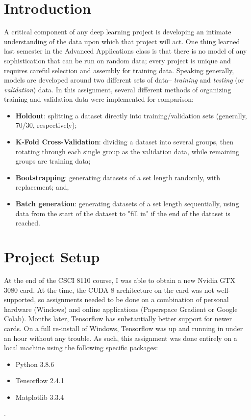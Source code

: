 \documentclass{article}
\begin{document}
  
  \graphicspath{{./images/}}
\section{Introduction}
A critical component of any deep learning project is developing an intimate understanding of the data upon which that project will act.
One thing learned last semester in the Advanced Applications class is that there is no model of any sophistication that can be run on random data; every project is unique and requires careful selection and assembly for training data.
Speaking generally, models are developed around two different sets of data-- \textit{training} and \textit{testing} (or \textit{validation}) data.
In this assignment, several different methods of organizing training and validation data were implemented for comparison:
\begin{itemize}
    \item \textbf{Holdout}: splitting a dataset directly into training/validation sets (generally, 70/30, respectively);
    \item \textbf{K-Fold Cross-Validation}: dividing a dataset into several groups, then rotating through each single group as the validation data, while remaining groups are training data;
    \item \textbf{Bootstrapping}: generating datasets of a set length randomly, with replacement; and,
    \item \textbf{Batch generation}: generating datasets of a set length sequentially, using data from the start of the dataset to "fill in" if the end of the dataset is reached.
\end{itemize}


\section{Project Setup} \label{setup}
At the end of the CSCI 8110 course, I was able to obtain a new Nvidia GTX 3080 card.
At the time, the CUDA 8 architecture on the card was not well-supported, so assignments needed to be done on a combination of personal hardware (Windows) and online applications (Paperspace Gradient or Google Colab).
Months later, Tensorflow has substantially better support for newer cards.
On a full re-install of Windows, Tensorflow was up and running in under an hour without any trouble.
As such, this assignment was done entirely on a local machine using the following specific packages:
\begin{itemize}
    \item Python 3.8.6 
    \item Tensorflow 2.4.1
    \item Matplotlib 3.3.4
\end{itemize}.
\end{document}
